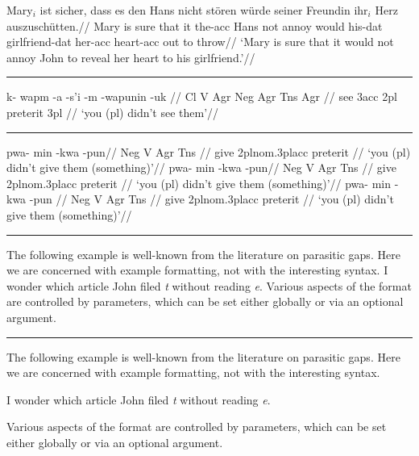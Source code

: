\documentclass[12pt]{article}
\begin{document}
\begingroup
\ex
\begingl
\gla Mary$_i$ ist sicher, dass es den Hans nicht st\"oren
w\"urde seiner Freundin ihr$_i$ Herz auszusch\"utten.//
\glb Mary is sure that it the-{\sc acc} Hans not annoy would
his-{\sc dat} girlfriend-{\sc dat} her-{\sc acc} heart-{\sc acc} {out to throw}//
\glft  `Mary is sure that it would not annoy John to reveal her
heart to his girlfriend.'//
\endgl
\xe
\endgroup
\bigskip

\filbreak\hrule\medskip

\begingroup
\ex
\begingl
\gla k- wapm -a -s'i -m -wapunin -uk //
\glb Cl V Agr Neg Agr Tns Agr //
 see {\sc 3acc} {} {\sc 2pl} preterit {\sc 3pl} //
\glft `you (pl) didn't see them'//
\endgl
\xe
\endgroup
\bigskip

\filbreak\hrule\medskip

\begingroup
\pex[interpartskip=3ex]
\a
\begingl
\gla pwa- min -kwa -pun//
\glb Neg V Agr Tns //
\glc {} give 2pl{\sc nom}.3pl{\sc acc} preterit //
\glft `you (pl) didn't give them (something)'//
\endgl
\a
\begingl[everygl=\openup.5ex,everygla=,everyglb=,
   everyglft=\it,aboveglftskip=1.5ex]
\gla pwa- min -kwa -pun//
\glb Neg V Agr Tns //
\glc {} give 2pl{\sc nom}.3pl{\sc acc} preterit //
\glft `you (pl) didn't give them (something)'//
\endgl
\a
\begingl[everygl=,everygla=\bf,everyglb=\it,
   everyglft=,aboveglftskip=0pt]
\gla pwa- min -kwa -pun //
\glb Neg V Agr Tns //
\glc {} give 2pl{\sc nom}.3pl{\sc acc} preterit //
\glft `you (pl) didn't give them (something)'//
\endgl
\xe
\endgroup
\bigskip

\filbreak\hrule\medskip

\begingroup
\exdisplay
The following example is well-known from the literature on
parasitic gaps.  Here we are concerned with example formatting,
not with the interesting syntax.
\ex
I wonder which article John filed {\sl t\/} without reading {\sl e}.
\xe
Various aspects of the format are controlled by parameters, which
can be set either globally or via an optional argument.
\xe
\endgroup
\bigskip

\filbreak\hrule\medskip

\begingroup
\exdisplay
The following example is well-known from the literature on
parasitic gaps.  Here we are concerned with example formatting,
not with the interesting syntax.

\ex[numoffset=2em,textoffset=.5em,aboveexskip=1ex,belowexskip=1ex]
I wonder which article John filed {\sl t\/} without reading {\sl e}.
\xe

\noindent Various aspects of the format are controlled by
parameters, which can be set either globally or via an optional
argument.
\xe
\endgroup
\bigskip
\end{document}
